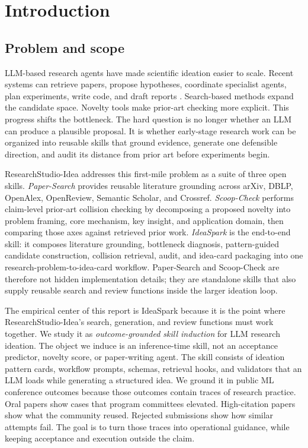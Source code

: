 \documentclass[10pt,a4paper]{article}
\begin{document}
\newpage
{\small
\tableofcontents
}
\newpage

\section{Introduction}
\label{sec:intro}

\subsection{Problem and scope}

LLM-based research agents have made scientific ideation easier to scale. Recent systems can retrieve papers, propose hypotheses, coordinate specialist agents, plan experiments, write code, and draft reports \cite{lu2024aiscientist,agentlab2025,airesearcher2025,idea2plan2025,ai_coscientist2025,autoresearch2025}. Search-based methods expand the candidate space. Novelty tools make prior-art checking more explicit. This progress shifts the bottleneck. The hard question is no longer whether an LLM can produce a plausible proposal. It is whether early-stage research work can be organized into reusable skills that ground evidence, generate one defensible direction, and audit its distance from prior art before experiments begin.

ResearchStudio-Idea addresses this first-mile problem as a suite of three open skills. \emph{Paper-Search} provides reusable literature grounding across arXiv, DBLP, OpenAlex, OpenReview, Semantic Scholar, and Crossref. \emph{Scoop-Check} performs claim-level prior-art collision checking by decomposing a proposed novelty into problem framing, core mechanism, key insight, and application domain, then comparing those axes against retrieved prior work. \emph{IdeaSpark} is the end-to-end skill: it composes literature grounding, bottleneck diagnosis, pattern-guided candidate construction, collision retrieval, audit, and idea-card packaging into one research-problem-to-idea-card workflow. Paper-Search and Scoop-Check are therefore not hidden implementation details; they are standalone skills that also supply reusable search and review functions inside the larger ideation loop.

The empirical center of this report is IdeaSpark because it is the point where ResearchStudio-Idea's search, generation, and review functions must work together. We study it as \emph{outcome-grounded skill induction} for LLM research ideation. The object we induce is an inference-time skill, not an acceptance predictor, novelty score, or paper-writing agent. The skill consists of ideation pattern cards, workflow prompts, schemas, retrieval hooks, and validators that an LLM loads while generating a structured idea. We ground it in public ML conference outcomes because those outcomes contain traces of research practice. Oral papers show cases that program committees elevated. High-citation papers show what the community reused. Rejected submissions show how similar attempts fail. The goal is to turn those traces into operational guidance, while keeping acceptance and execution outside the claim.
\end{document}
